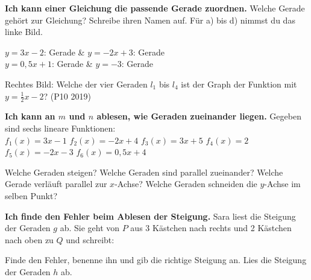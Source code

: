 \begin{aufgabe}{\textbf{Ich kann einer Gleichung die passende Gerade zuordnen.} Welche Gerade gehört zur Gleichung? Schreibe ihren Namen auf. Für a) bis d) nimmst du das linke Bild.}

\begin{ksys}[xmin=-3,xmax=3,ymin=-5,ymax=5,ablesen]
\end{ksys}\ksysabstand\begin{ksys}[xmin=-4,xmax=4,ymin=-4,ymax=4,ablesen]
\end{ksys}

\begin{teilezwei}
\tz $y = 3x - 2$: \quad Gerade \leerfeld & \tz $y = -2x + 3$: \quad Gerade \leerfeld \\
\tz $y = 0{,}5x + 1$: \quad Gerade \leerfeld & \tz $y = -3$: \quad Gerade \leerfeld \\
\end{teilezwei}
\begin{teile}
\teil Rechtes Bild: Welche der vier Geraden $l_1$ bis $l_4$ ist der Graph der Funktion mit $y = \frac{1}{2}x - 2$? \quad \leerfeld \quad (P10 2019)
\end{teile}
\end{aufgabe}

\begin{aufgabe}{\textbf{Ich kann an $m$ und $n$ ablesen, wie Geraden zueinander liegen.} Gegeben sind sechs lineare Funktionen:\\
$f_1(x) = 3x - 1$ \quad $f_2(x) = -2x + 4$ \quad $f_3(x) = 3x + 5$ \quad $f_4(x) = 2$ \quad $f_5(x) = -2x - 3$ \quad $f_6(x) = 0{,}5x + 4$}
\begin{teile}
\teil Welche Geraden steigen? \quad \leerfeld
\teil Welche Geraden sind parallel zueinander? \quad \leerfeld
\teil Welche Gerade verläuft parallel zur $x$-Achse? \quad \leerfeld
\teil Welche Geraden schneiden die $y$-Achse im selben Punkt? \quad \leerfeld
\end{teile}
\end{aufgabe}

\begin{aufgabe}{\textbf{Ich finde den Fehler beim Ablesen der Steigung.} Sara liest die Steigung der Geraden $g$ ab. Sie geht von $P$ aus 3 Kästchen nach rechts und 2 Kästchen nach oben zu $Q$ und schreibt:}

\begin{ksys}[xmin=-2,xmax=5,ymin=-5,ymax=4,ablesen]
\end{ksys}

\begin{teile}
\teil Finde den Fehler, benenne ihn und gib die richtige Steigung an.
\teil Lies die Steigung der Geraden $h$ ab. \quad {}
\end{teile}
\end{aufgabe}

